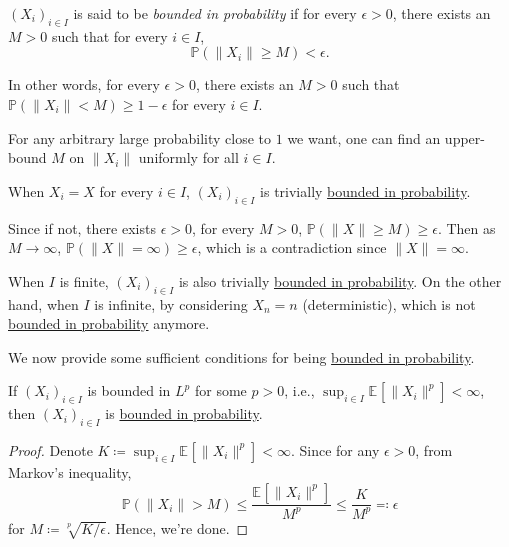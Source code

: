 \begin{definition}\label{def:bounded-in-probability}
	\((X_i)_{i \in I}\) is said to be \emph{bounded in probability} if for every \(\epsilon > 0\), there exists an \(M > 0\) such that for every \(i \in I\),
	\[
		\mathbb{P} (\lVert X_i \rVert \geq M) < \epsilon .
	\]
\end{definition}

In other words, for every \(\epsilon > 0\), there exists an \(M > 0\) such that \(\mathbb{P} (\lVert X_i \rVert < M) \geq 1 - \epsilon\) for every \(i \in I\).

\begin{intuition}
	For any arbitrary large probability close to \(1\) we want, one can find an upper-bound \(M\) on \(\lVert X_i \rVert \) uniformly for all \(i \in I\).
\end{intuition}

\begin{note}
	When \(X_i = X\) for every \(i \in I\), \((X_i)_{i \in I}\) is trivially \hyperref[def:bounded-in-probability]{bounded in probability}.
\end{note}
\begin{explanation}
	Since if not, there exists \(\epsilon > 0\), for every \(M > 0\), \(\mathbb{P} (\lVert X \rVert \geq M) \geq \epsilon \). Then as \(M \to \infty \), \(\mathbb{P} (\lVert X \rVert = \infty ) \geq \epsilon \), which is a contradiction since \(\lVert X \rVert = \infty \).
\end{explanation}

\begin{remark}
	When \(I\) is finite, \((X_i)_{i \in I}\) is also trivially \hyperref[def:bounded-in-probability]{bounded in probability}. On the other hand, when \(I\) is infinite, by considering \(X_n = n\) (deterministic), which is not \hyperref[def:bounded-in-probability]{bounded in probability} anymore.
\end{remark}

We now provide some sufficient conditions for being \hyperref[def:bounded-in-probability]{bounded in probability}.

\begin{proposition}
	If \((X_i)_{i \in I}\) is bounded in \(L^p\) for some \(p > 0\), i.e., \(\sup _{i \in I} \mathbb{E}_{}\left[\lVert X_i \rVert ^p \right] < \infty \), then \((X_i)_{i \in I}\) is \hyperref[def:bounded-in-probability]{bounded in probability}.
\end{proposition}
\begin{proof}
	Denote \(K \coloneqq \sup _{i \in I} \mathbb{E}_{}\left[\lVert X_i \rVert ^p \right] < \infty\). Since for any \(\epsilon > 0\), from Markov's inequality,
	\[
		\mathbb{P} (\lVert X_i \rVert > M)
		\leq \frac{\mathbb{E}_{}\left[\lVert X_i \rVert ^p \right] }{M^p}
		\leq \frac{K}{M^p}
		\eqqcolon \epsilon
	\]
	for \(M \coloneqq \sqrt[p]{K / \epsilon } \). Hence, we're done.
\end{proof}

